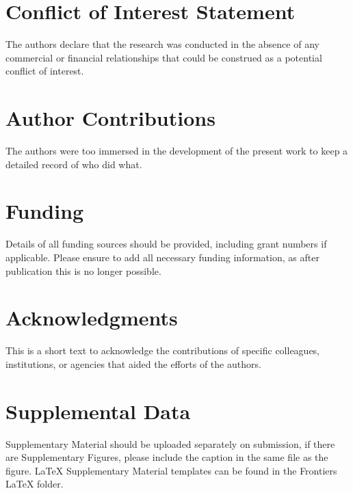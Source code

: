 \documentclass[utf8]{FrontiersinHarvard} %
\providecommand{\href}[2]{#2}
\renewcommand*{\|}[1][]{\nonscript\:#1\vert\nonscript\:\mathopen{}}
\begin{document}
\section*{Conflict of Interest Statement}

The authors declare that the research was conducted in the absence of any commercial or financial relationships that could be construed as a potential conflict of interest.

\section*{Author Contributions}

The authors were too immersed in the development of the present work to keep a detailed record of who did what.


\section*{Funding}
Details of all funding sources should be provided, including grant numbers if applicable. Please ensure to add all necessary funding information, as after publication this is no longer possible.

\section*{Acknowledgments}
This is a short text to acknowledge the contributions of specific colleagues, institutions, or agencies that aided the efforts of the authors.

\section*{Supplemental Data}
 \href{http://home.frontiersin.org/about/author-guidelines#SupplementaryMaterial}{Supplementary Material} should be uploaded separately on submission, if there are Supplementary Figures, please include the caption in the same file as the figure. LaTeX Supplementary Material templates can be found in the Frontiers LaTeX folder.
\end{document}
